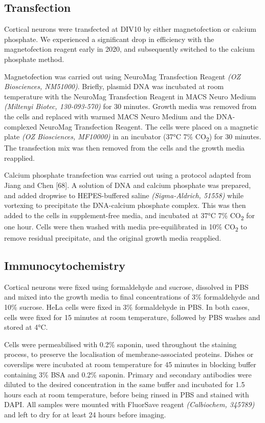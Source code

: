 \documentclass[
  12pt,
  a4paper,
]{book}
\begin{document}
\hypertarget{transfection}{%
\subsection{Transfection}\label{transfection}}

Cortical neurons were transfected at DIV10 by either magnetofection or calcium phosphate. We experienced a significant drop in efficiency with the magnetofection reagent early in 2020, and subsequently switched to the calcium phosphate method.

Magnetofection was carried out using NeuroMag Transfection Reagent \emph{(OZ Biosciences, NM51000)}. Briefly, plasmid DNA was incubated at room temperature with the NeuroMag Transfection Reagent in MACS Neuro Medium \emph{(Miltenyi Biotec, 130-093-570)} for 30 minutes. Growth media was removed from the cells and replaced with warmed MACS Neuro Medium and the DNA-complexed NeuroMag Transfection Reagent. The cells were placed on a magnetic plate \emph{(OZ Biosciences, MF10000)} in an incubator (37°C 7\% CO\textsubscript{2}) for 30 minutes. The transfection mix was then removed from the cells and the growth media reapplied.

Calcium phosphate transfection was carried out using a protocol adapted from Jiang and Chen {[}68{]}. A solution of DNA and calcium phosphate was prepared, and added dropwise to HEPES-buffered saline \emph{(Sigma-Aldrich, 51558)} while vortexing to precipitate the DNA-calcium phosphate complex. This was then added to the cells in supplement-free media, and incubated at 37°C 7\% CO\textsubscript{2} for one hour. Cells were then washed with media pre-equilibrated in 10\% CO\textsubscript{2} to remove residual precipitate, and the original growth media reapplied.

\hypertarget{immuno}{%
\subsection{Immunocytochemistry}\label{immuno}}

Cortical neurons were fixed using formaldehyde and sucrose, dissolved in PBS and mixed into the growth media to final concentrations of 3\% formaldehyde and 10\% sucrose. HeLa cells were fixed in 3\% formaldehyde in PBS. In both cases, cells were fixed for 15 minutes at room temperature, followed by PBS washes and stored at 4°C.

Cells were permeabilised with 0.2\% saponin, used throughout the staining process, to preserve the localisation of membrane-associated proteins. Dishes or coverslips were incubated at room temperature for 45 minutes in blocking buffer containing 3\% BSA and 0.2\% saponin. Primary and secondary antibodies were diluted to the desired concentration in the same buffer and incubated for 1.5 hours each at room temperature, before being rinsed in PBS and stained with DAPI. All samples were mounted with FluorSave reagent \emph{(Calbiochem, 345789)} and left to dry for at least 24 hours before imaging.
\end{document}
